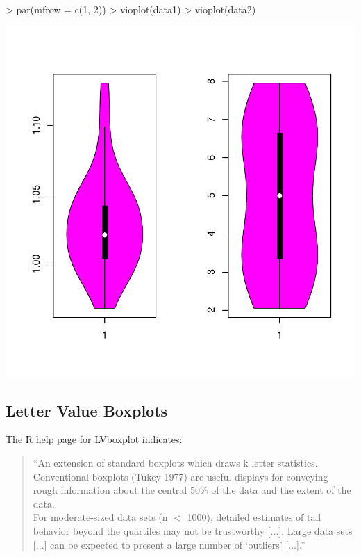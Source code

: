 \documentclass[12pt,letterpaper,final]{article}
\begin{document}
\begin{Schunk}
\begin{Sinput}
> par(mfrow = c(1, 2))
> vioplot(data1)
> vioplot(data2)
\end{Sinput}
\end{Schunk}
\includegraphics{lect_main-013}


\newpage


\subsection{Letter Value Boxplots}


The R help page for LVboxplot indicates:
\begin{quotation}
``An extension of standard boxplots which draws k letter statistics. Conventional boxplots (Tukey 1977) 
are useful displays for conveying rough information about the central 50\% of the data and the 
extent of the data. \\[0.2cm]
For moderate-sized data sets (n $<$ 1000), detailed estimates of tail behavior beyond the quartiles 
may not be trustworthy [$\ldots$]. Large data sets [$\ldots$] can be expected to present a large 
number of `outliers' [$\ldots$].''
\end{quotation}
\end{document}
